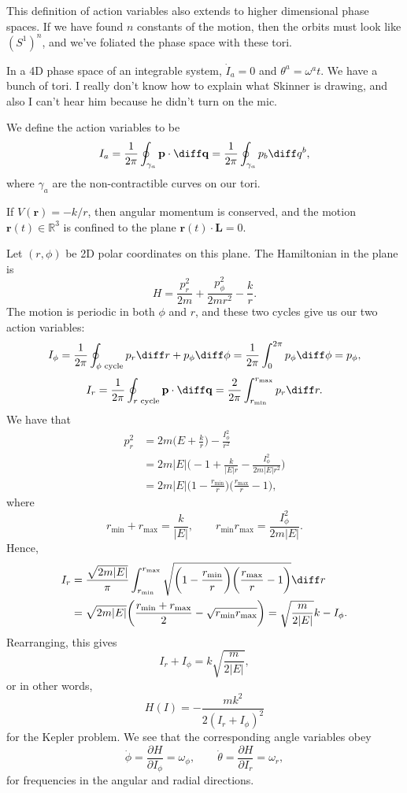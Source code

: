\documentclass[12pt]{article}
\begin{document}
This definition of action variables also extends to higher dimensional phase spaces. If we have found $n$ constants of the motion, then the orbits must look like $(S^1)^n$, and we've foliated the phase space with these tori.

In a 4D phase space of an integrable system, $\dot I_a = 0$ and $\theta^a = \omega^a t$. We have a bunch of tori. I really don't know how to explain what Skinner is drawing, and also I can't hear him because he didn't turn on the mic.

We define the action variables to be
\[
I_a = \frac{1}{2 \pi} \oint_{\gamma_a} \mathbf{p} \cdot \diff \mathbf{q} = \frac{1}{2 \pi} \oint_{\gamma_a} p_b \diff q^b,
\]
where $\gamma_a$ are the non-contractible curves on our tori.

\begin{exbox}
	If $V(\mathbf{r}) = -k/r$, then angular momentum is conserved, and the motion $\mathbf{r}(t) \in \mathbb{R}^3$ is confined to the plane $\mathbf{r}(t) \cdot \mathbf{L} = 0$.

	Let $(r, \phi)$ be 2D polar coordinates on this plane. The Hamiltonian in the plane is
	\[
	H = \frac{p_r^2}{2m} + \frac{p_\phi^2}{2mr^2} - \frac{k}{r}.
	\]
	The motion is periodic in both $\phi$ and $r$, and these two cycles give us our two action variables:
	\[
		I_\phi = \frac{1}{2\pi} \oint_{\phi \text{ cycle}} p_r \diff r + p_\phi \diff \phi = \frac{1}{2\pi} \int_0^{2\pi} p_\phi \diff \phi = p_\phi,
	\]
	\[
		I_r = \frac{1}{2\pi} \oint_{r \text{ cycle}} \mathbf{p} \cdot \diff \mathbf{q} = \frac{2}{2 \pi} \int_{r_{\mathrm{min}}}^{r_{\mathrm{max}}} p_r \diff r.
	\]
	We have that
	\begin{align*}
		p_r^2 &= 2m\biggl( E + \frac{k}{r} \biggr) - \frac{I_\phi^2}{r^2} \\
		      &= 2m|E| \biggl(-1 + \frac{k}{|E|r} - \frac{I_\phi^2}{2m|E|r^2} \biggr) \\
		      &= 2m|E| \biggl(1 - \frac{r_{\mathrm{min}}}{r} \biggr) \biggl( \frac{r_{\mathrm{max}}}{r} - 1 \biggr),
	\end{align*}
	where
	\[
	r_{\mathrm{min}} + r_{\mathrm{max}} = \frac{k}{|E|}, \qquad r_{\mathrm{min}}r_{\mathrm{max}} = \frac{I_\phi^2}{2m|E|}.
	\]
	Hence,
	\begin{align*}
		I_r &= \frac{\sqrt{2m|E|}}{\pi} \int_{r_{\mathrm{min}}}^{r_{\mathrm{max}}} \sqrt{\biggl(1 - \frac{r_{\mathrm{min}}}{r} \biggr) \biggl( \frac{r_{\mathrm{max}}}{r} - 1 \biggr)} \diff r \\
		&= \sqrt{2m|E|} \biggl( \frac{r_{\mathrm{min}} + r_{\mathrm{max}}}{2} - \sqrt{r_{\mathrm{min}} r_{\mathrm{max}}} \biggr) = \sqrt{\frac{m}{2|E|}} k - I_\phi.
	\end{align*}
	Rearranging, this gives
	\[
	I_r + I_\phi = k \sqrt{\frac{m}{2|E|}},
	\]
	or in other words,
	\[
	H(I) = - \frac{m k^2}{2(I_r + I_\phi)^2}
	\]
	for the Kepler problem. We see that the corresponding angle variables obey
	\[
	\dot \phi = \frac{\partial H}{\partial I_\phi} = \omega_\phi, \qquad \dot \theta = \frac{\partial H}{\partial I_r} = \omega_r,
	\]
	for frequencies in the angular and radial directions.


\end{exbox}
\end{document}
